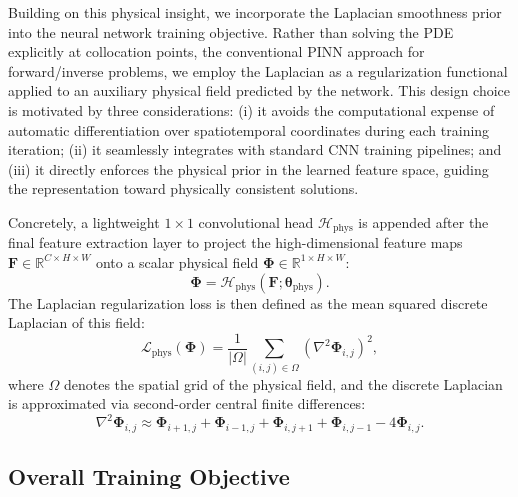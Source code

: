 \documentclass[twocolumn,iicol,pdflatex,sn-mathphys-num]{sn-jnl}%
\begin{document}
Building on this physical insight, we incorporate the Laplacian smoothness prior into the neural network training objective. Rather than solving the PDE explicitly at collocation points, the conventional PINN approach for forward/inverse problems, we employ the Laplacian as a regularization functional applied to an auxiliary physical field predicted by the network. This design choice is motivated by three considerations: (i) it avoids the computational expense of automatic differentiation over spatiotemporal coordinates during each training iteration; (ii) it seamlessly integrates with standard CNN training pipelines; and (iii) it directly enforces the physical prior in the learned feature space, guiding the representation toward physically consistent solutions.

Concretely, a lightweight $1 \times 1$ convolutional head $\mathcal{H}_{\text{phys}}$ is appended after the final feature extraction layer to project the high-dimensional feature maps $\bm{F} \in \mathbb{R}^{C \times H \times W}$ onto a scalar physical field $\bm{\Phi} \in \mathbb{R}^{1 \times H \times W}$:
\begin{equation}
	\bm{\Phi} = \mathcal{H}_{\text{phys}}(\bm{F}; \bm{\theta}_{\text{phys}}).
	\label{eq:phys_head}
\end{equation}
The Laplacian regularization loss is then defined as the mean squared discrete Laplacian of this field:
\begin{equation}
	\mathcal{L}_{\text{phys}}(\bm{\Phi}) = \frac{1}{|\Omega|} \sum_{(i,j) \in \Omega} \left( \nabla^2 \bm{\Phi}_{i,j} \right)^2,
	\label{eq:laplacian_loss}
\end{equation}
where $\Omega$ denotes the spatial grid of the physical field, and the discrete Laplacian is approximated via second-order central finite differences:
\begin{equation}
	\nabla^2 \bm{\Phi}_{i,j} \approx \bm{\Phi}_{i+1,j} + \bm{\Phi}_{i-1,j} + \bm{\Phi}_{i,j+1} + \bm{\Phi}_{i,j-1} - 4\bm{\Phi}_{i,j}.
	\label{eq:discrete_laplacian}
\end{equation}

\subsection{Overall Training Objective}
\end{document}
